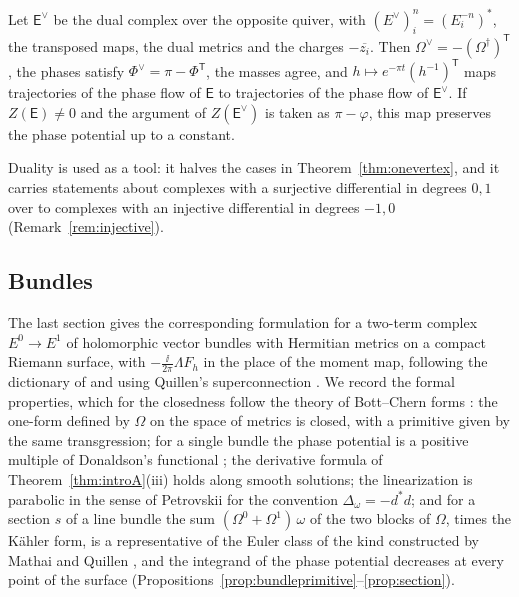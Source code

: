\begin{theorem}[Duality]\label{thm:introB}
Let $\mathsf E^\vee$ be the dual complex over the opposite quiver, with
$(E^\vee)_i^n=(E_i^{-n})^*$, the transposed maps, the dual metrics and the
charges $-\overline{z_i}$. Then $\Omega^\vee=-(\Omega^\dagger)^{\mathsf T}$,
the phases satisfy $\Phi^\vee=\pi-\Phi^{\mathsf T}$, the masses agree, and
$h\mapsto e^{-\pi t}(h^{-1})^{\mathsf T}$ maps trajectories of the phase flow
of $\mathsf E$ to trajectories of the phase flow of $\mathsf E^\vee$. If
$Z(\mathsf E)\neq0$ and the argument of $Z(\mathsf E^\vee)$ is taken as
$\pi-\varphi$, this map preserves the phase potential up to a constant.
\end{theorem}

Duality is used as a tool: it halves the cases in
Theorem~\ref{thm:onevertex}, and it carries statements about complexes with a
surjective differential in degrees $0,1$ over to complexes with an injective
differential in degrees $-1,0$ (Remark~\ref{rem:injective}).

\subsection{Bundles}
The last section gives the corresponding formulation for a two-term complex
$E^0\to E^1$ of holomorphic vector bundles with Hermitian metrics on a
compact Riemann surface, with $-\frac{\ii}{2\pi}\Lambda F_h$ in the place of
the moment map, following the dictionary of \cite[Remark~5.14]{hkkp26} and
using Quillen's superconnection \cite{qui85}. We record the formal
properties, which for the closedness follow the theory of Bott--Chern forms
\cite{bc65,don85,bgs88}: the one-form defined by $\Omega$ on the space of
metrics is closed, with a primitive given by the same transgression; for a
single bundle the phase potential is a positive multiple of Donaldson's
functional \cite{don85}; the derivative formula of
Theorem~\ref{thm:introA}(iii) holds along smooth solutions; the
linearization is parabolic in the sense of Petrovskii
for the convention $\Delta_\omega=-d^*d$; and for a section $s$ of a
line bundle the sum $(\Omega^0+\Omega^1)\,\omega$ of the two blocks of
$\Omega$, times the K\"ahler form, is a representative of the Euler class of
the kind constructed by Mathai and Quillen \cite{mq86}, and the integrand of
the phase potential decreases at every point of the surface
(Propositions~\ref{prop:bundleprimitive}--\ref{prop:section}).

